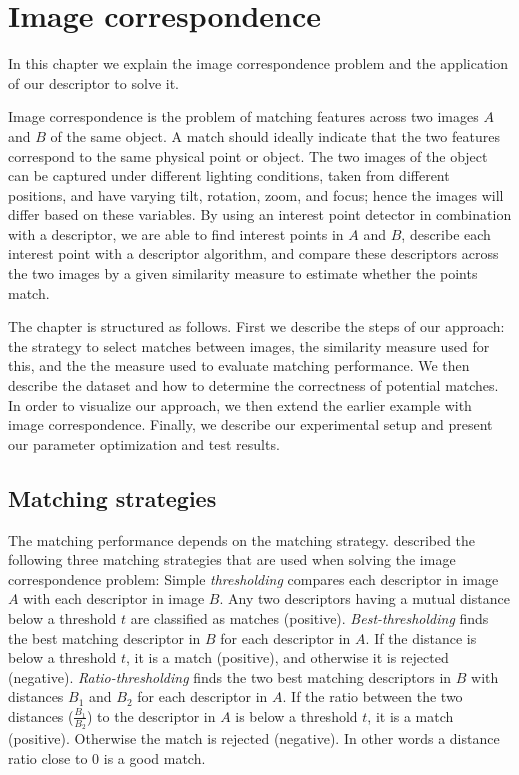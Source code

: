 \documentclass[thesis.tex]{subfiles}
\begin{document}
\chapter{Image correspondence}
\label{sec:ic}

In this chapter we explain the image correspondence problem and the application of our descriptor to solve it.

Image correspondence is the problem of matching features across two images $A$ and $B$ of the same object. A match should ideally indicate that the two features correspond to the same physical point or object. The two images of the object can be captured under different lighting conditions, taken from different positions, and have varying tilt, rotation, zoom, and focus; hence the images will differ based on these variables. By using an interest point detector in combination with a descriptor, we are able to find interest points in $A$ and $B$, describe each interest point with a descriptor algorithm, and compare these descriptors across the two images by a given similarity measure to estimate whether the points match.

The chapter is structured as follows. First we describe the steps of our approach: the strategy to select matches between images, the similarity measure used for this, and the the measure used to evaluate matching performance. We then describe the dataset and how to determine the correctness of potential matches. In order to visualize our approach, we then extend the earlier example with image correspondence. Finally, we describe our experimental setup and present our parameter optimization and test results.

\section{Matching strategies}
\label{sec:matching_strategies}

The matching performance depends on the matching strategy. \citet{mikolajczyk2005performance} described the following three matching strategies that are used when solving the image correspondence problem:
Simple \emph{thresholding} compares each descriptor in image $A$ with each descriptor in image $B$. Any two descriptors having a mutual distance below a threshold $t$ are classified as matches (positive). \emph{Best-thresholding} finds the best matching descriptor in $B$ for each descriptor in $A$. If the distance is below a threshold $t$, it is a match (positive), and otherwise it is rejected (negative). \emph{Ratio-thresholding} finds the two best matching descriptors in $B$ with distances $B_1$ and $B_2$ for each descriptor in $A$. If the ratio between the two distances ($\frac{B_1}{B_2}$) to the descriptor in $A$ is below a threshold $t$, it is a match (positive). Otherwise the match is rejected (negative). In other words a distance ratio close to 0 is a good match.
\end{document}
